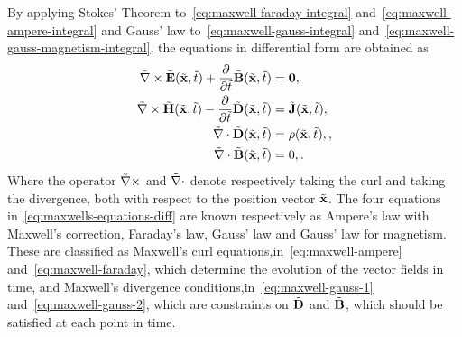 By applying Stokes' Theorem to~\eqref{eq:maxwell-faraday-integral}
and~\eqref{eq:maxwell-ampere-integral} and Gauss' law
to~\eqref{eq:maxwell-gauss-integral}
and~\eqref{eq:maxwell-gauss-magnetism-integral}, the equations in differential
form are obtained as
\begin{subequations}
  \label{eq:maxwells-equations-diff}
  \begin{align}
    \tilde{\nabla} \times \tilde{\mathbf{E}}(\tilde{\mathbf{x}},\tilde{t}) + \frac{\partial}{\partial \tilde{t} } \tilde{\mathbf{B}}(\tilde{\mathbf{x}}, \tilde{t})&= \mathbf{0}, \label{eq:maxwell-faraday} \\
    \tilde{\nabla} \times \tilde{\mathbf{H}}(\tilde{\mathbf{x}},\tilde{t}) - \frac{\partial}{\partial \tilde{t} } \tilde{\mathbf{D}}(\tilde{\mathbf{x}}, \tilde{t})&= \tilde{\mathbf{J}}(\tilde{\mathbf{x}},\tilde{t}), \label{eq:maxwell-ampere} \\
    \tilde{\nabla} \cdot \tilde{\mathbf{D}} (\tilde{\mathbf{x}},\tilde{t}) &= \rho(\tilde{\mathbf{x}},\tilde{t}), \label{eq:maxwell-gauss-1}, \\
    \tilde{\nabla} \cdot \tilde{\mathbf{B}} (\tilde{\mathbf{x}},\tilde{t}) &= 0, \label{eq:maxwell-gauss-2} .
  \end{align}
\end{subequations}
Where the operator $\tilde{\nabla} \times$ and $\tilde{\nabla} \cdot$ denote
respectively taking the curl and taking the divergence, both with respect to the
position vector $\tilde{\mathbf{x}}$. The four equations
in~\eqref{eq:maxwells-equations-diff} are known respectively as Ampere's law
with Maxwell's correction, Faraday's law, Gauss' law and Gauss' law for
magnetism. These are classified as Maxwell's curl
equations,in~\eqref{eq:maxwell-ampere} and~\eqref{eq:maxwell-faraday}, which
determine the evolution of the vector fields in time, and Maxwell's divergence
conditions,in~\eqref{eq:maxwell-gauss-1} and~\eqref{eq:maxwell-gauss-2}, which
are constraints on $\tilde{\mathbf{D}}$ and $\tilde{\mathbf{B}}$, which should be satisfied at each
point in time.

